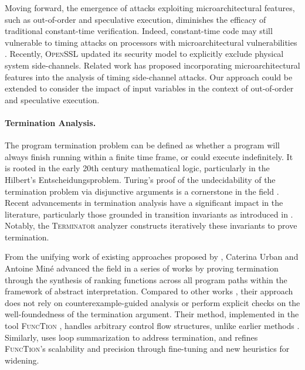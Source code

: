 Moving forward, the emergence of attacks exploiting microarchitectural features, such as out-of-order and speculative execution, diminishes the efficacy of traditional constant-time verification. Indeed, constant-time code may still vulnerable to timing attacks on processors with microarchitectural vulnerabilities . Recently, \textsc{OpenSSL} updated its security model to explicitly exclude physical system side-channels. Related work  has proposed incorporating microarchitectural features into the analysis of timing side-channel attacks. Our approach could be extended to consider the impact of input variables in the context of out-of-order and speculative execution.

\paragraph{Termination Analysis.}


The program termination problem can be defined as whether a program will always finish running within a finite time frame, or could execute indefinitely.
It is rooted in the early 20th century mathematical logic, particularly in the Hilbert's Entscheidungsproblem. Turing's proof of the undecidability of the termination problem via disjunctive arguments is a cornerstone in the field .
Recent advancements in termination analysis have a significant impact in the literature, particularly those grounded in transition invariants as introduced in \textcite{Podelski2004}. Notably, the \textsc{Terminator} analyzer  constructs iteratively these invariants to prove termination.

From the unifying work of existing approaches proposed by ,
Caterina Urban and Antoine Min{\'{e}} advanced the field in a series of works  by proving termination through the synthesis of ranking functions across all program paths within the framework of abstract interpretation.
Compared to other works , their approach does not rely on counterexample-guided analysis or perform explicit checks on the well-foundedness of the termination argument. Their method, implemented in the tool \textsc{FuncTion} , handles arbitrary control flow structures, unlike earlier methods . Similarly,  uses loop summarization to address termination, and  refines \textsc{FuncTion}'s scalability and precision through fine-tuning and new heuristics for widening.

